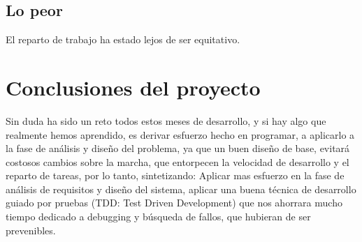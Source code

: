 \documentclass[11 pt]{book}
\begin{document}
		\subsection*{Lo peor}
			El reparto de trabajo ha estado lejos de ser equitativo.
			
	\section*{Conclusiones del proyecto}
		Sin duda ha sido un reto todos estos meses de desarrollo, y si hay algo que realmente hemos aprendido, es derivar esfuerzo hecho en programar, a aplicarlo a la fase de análisis y diseño del problema, ya que un buen diseño de base, evitará costosos cambios sobre la marcha, que entorpecen la velocidad de desarrollo y el reparto de tareas, por lo tanto, sintetizando: Aplicar mas esfuerzo en la fase de análisis de requisitos y diseño del sistema, aplicar una buena técnica de desarrollo guiado por pruebas (TDD: Test Driven Development) que nos ahorrara mucho tiempo dedicado a debugging y búsqueda de fallos, que hubieran de ser prevenibles.
		
\end{document}
